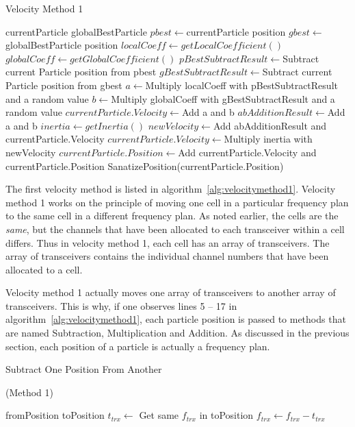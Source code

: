 \begin{algorithm}
\caption{Velocity Method 1}
\label{alg:velocitymethod1}
	\begin{algorithmic}[1]
	\Require currentParticle
	\Require globalBestParticle
	\State $pbest \leftarrow $currentParticle position
	\State $gbest \leftarrow $globalBestParticle position
	\State $localCoeff \leftarrow getLocalCoefficient()$
	\State $globalCoeff \leftarrow getGlobalCoefficient()$
	\State $pBestSubtractResult \leftarrow $Subtract current Particle position from pbest
	\State $gBestSubtractResult \leftarrow $Subtract current Particle position from gbest
	\State $a \leftarrow $Multiply localCoeff with pBestSubtractResult and a random value
	\State $b \leftarrow $Multiply globalCoeff with gBestSubtractResult and a random value
		\State $currentParticle.Velocity \leftarrow $Add a and b
	\Else
		\State $abAdditionResult \leftarrow $Add a and b
		\State $inertia \leftarrow getInertia()$
		\State $newVelocity \leftarrow $Add abAdditionResult and currentParticle.Velocity
		\State $currentParticle.Velocity \leftarrow $Multiply inertia with newVelocity
	\EndIf
	\State $currentParticle.Position \leftarrow $Add currentParticle.Velocity and currentParticle.Position
	\State SanatizePosition(currentParticle.Position)
	\end{algorithmic}
\end{algorithm}

The first velocity method is listed in algorithm~\ref{alg:velocitymethod1}. Velocity method 1 works on the principle of moving one cell in a particular frequency plan to the same cell in a different frequency plan. As noted earlier, the cells are the \emph{same}, but the channels that have been allocated to each transceiver within a cell differs. Thus in velocity method 1, each cell has an array of transceivers. The array of transceivers contains the individual channel numbers that have been allocated to a cell.

Velocity method 1 actually moves one array of transceivers to another array of transceivers. This is why, if one observes lines 5 -- 17 in algorithm~\ref{alg:velocitymethod1}, each particle position is passed to methods that are named Subtraction, Multiplication and Addition. As discussed in the previous section, each position of a particle is actually a frequency plan.

\begin{algorithm}
\caption{Subtract One Position From Another} (Method 1)
\label{alg:arraySubtract}
\begin{algorithmic}[1]
	\Require fromPosition
	\Require toPosition
			\State $t_{trx} \leftarrow$ Get same $f_{trx}$ in toPosition
			\State $f_{trx} \leftarrow f_{trx} - t_{trx}$
		\EndFor
	\EndFor
\end{algorithmic}
\end{algorithm}

